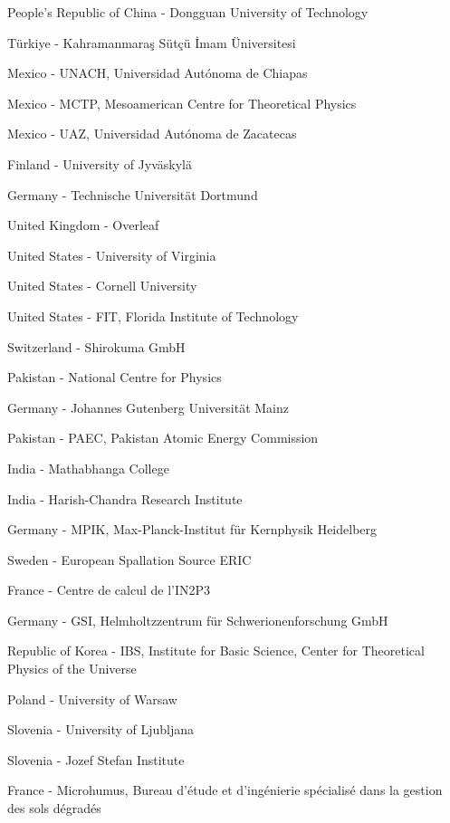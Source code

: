 \item[$^{238}$] People's Republic of China - Dongguan University of Technology
\item[$^{239}$] T{\"u}rkiye - Kahramanmara{\c s} S{\"u}t{\c c}{\"u} {\.{I}}mam {\"U}niversitesi
\item[$^{240}$] Mexico - UNACH, Universidad Aut{\'o}noma de Chiapas
\item[$^{241}$] Mexico - MCTP, Mesoamerican Centre for Theoretical Physics
\item[$^{242}$] Mexico - UAZ, Universidad Aut\'onoma de Zacatecas
\item[$^{243}$] Finland - University of Jyv{\"a}skyl{\"a}
\item[$^{244}$] Germany - Technische Universit{\"a}t Dortmund
\item[$^{245}$] United Kingdom - Overleaf
\item[$^{246}$] United States - University of Virginia
\item[$^{247}$] United States - Cornell University
\item[$^{248}$] United States - FIT, Florida Institute of Technology
\item[$^{249}$] Switzerland - Shirokuma GmbH
\item[$^{250}$] Pakistan - National Centre for Physics
\item[$^{251}$] Germany - Johannes Gutenberg Universit{\"a}t Mainz
\item[$^{252}$] Pakistan - PAEC, Pakistan Atomic Energy Commission
\item[$^{253}$] India - Mathabhanga College
\item[$^{254}$] India - Harish-Chandra Research Institute
\item[$^{255}$] Germany - MPIK, Max-Planck-Institut f{\"u}r Kernphysik Heidelberg
\item[$^{256}$] Sweden - European Spallation Source ERIC
\item[$^{257}$] France - Centre de calcul de l'IN2P3
\item[$^{258}$] Germany - GSI, Helmholtzzentrum f{\"u}r Schwerionenforschung GmbH
\item[$^{259}$] Republic of Korea - IBS, Institute for Basic Science, Center for Theoretical Physics of the Universe
\item[$^{260}$] Poland - University of Warsaw
\item[$^{261}$] Slovenia - University of Ljubljana
\item[$^{262}$] Slovenia - Jozef Stefan Institute
\item[$^{263}$] France - Microhumus, Bureau d'{\'e}tude et d'ing{\'e}nierie sp{\'e}cialis{\'e} dans la gestion des sols d{\'e}grad{\'e}s
